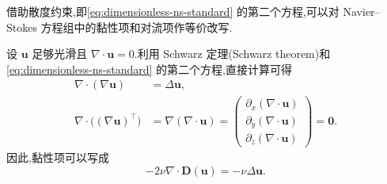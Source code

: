 \begin{note}\label{note:equivalent-term-forms}
借助散度约束,即\cref{eq:dimensionless-ns-standard} 的第二个方程,可以对 Navier--Stokes 方程组中的黏性项和对流项作等价改写.

设 $\bm{u}$ 足够光滑且 $\nabla\cdot\bm{u}=0$.利用 Schwarz 定理(Schwarz theorem)和\cref{eq:dimensionless-ns-standard} 的第二个方程,直接计算可得
\begin{equation}\label{eq:viscous-laplacian-identity}
\begin{aligned}
  \nabla\cdot(\nabla\bm{u})&=\Delta\bm{u},\\
  \nabla\cdot\bigl((\nabla\bm{u})^{\top}\bigr)
  &=\nabla(\nabla\cdot\bm{u})
   =\begin{pmatrix}
     \partial_x(\nabla\cdot\bm{u})\\
     \partial_y(\nabla\cdot\bm{u})\\
     \partial_z(\nabla\cdot\bm{u})
    \end{pmatrix}
   =\bm{0}.
\end{aligned}
\end{equation}
因此,黏性项可以写成
\begin{equation}\label{eq:viscous-term-laplacian}
  -2\nu\nabla\cdot\bm{D}(\bm{u})=-\nu\Delta\bm{u}.
\end{equation}


\end{note}
